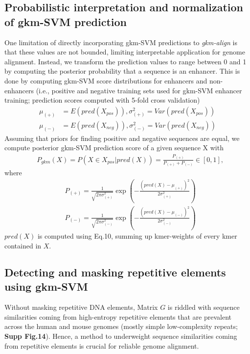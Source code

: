 \documentclass[english]{article}
\begin{document}
  \subsection{Probabilistic interpretation and normalization of gkm-SVM prediction}
 One limitation of directly incorporating gkm-SVM predictions to \textit{gkm-align} is that these values are not bounded, limiting interpretable application for genome alignment. Instead, we transform the prediction values to range between 0 and 1 by computing the posterior probability that a sequence is an enhancer. This is done by computing gkm-SVM score distributions for enhancers and non-enhancers (i.e., positive and negative training sets used for gkm-SVM enhancer training; prediction scores computed with 5-fold cross validation)
 \begin{align*}
     \mu_{(+)} &= E(pred(X_{pos})), \sigma^2_{(+)} = Var(pred(X_{pos}))\\
     \mu_{(-)} &= E(pred(X_{neg})), \sigma^2_{(-)} = Var(pred(X_{neg}))
\end{align*}
Assuming that priors for finding positive and negative sequences are equal, we compute posterior gkm-SVM prediction score of a given sequence X with
 \begin{align*}
     &P_{gkm}(X) = P(X\in X_{pos}|pred(X))= \frac{P_{(+)}}{P_{(+)} + P_{(-)}} \in [0,1], \tag{Eq.11} 
\end{align*}
where
\begin{align*}
     &P_{(+)} = \frac{1}{\sqrt{2\pi \sigma_{(+)}^2}}\exp\left(-\frac{(pred(X)-\mu_{(+)})^2}{2\sigma_{(+)}^2}\right)\\ 
     &P_{(-)} = \frac{1}{\sqrt{2\pi \sigma_{(-)}^2}}\exp\left(-\frac{(pred(X)-\mu_{(-)})^2}{2\sigma_{(-)}^2}\right)
 \end{align*}
$pred(X)$ is computed using Eq.10, summing up kmer-weights of every kmer contained in $X$.





 
\subsection{Detecting and masking repetitive elements using gkm-SVM}

Without masking repetitive DNA elements, Matrix  $G$ is riddled with sequence similarities coming from high-entropy repetitive elements that are prevalent across the human and mouse genomes (mostly simple low-complexity repeats; \textbf{Supp Fig.14}). Hence, a method to underweight sequence similarities coming from repetitive elements is crucial for reliable genome alignment. 
\end{document}
